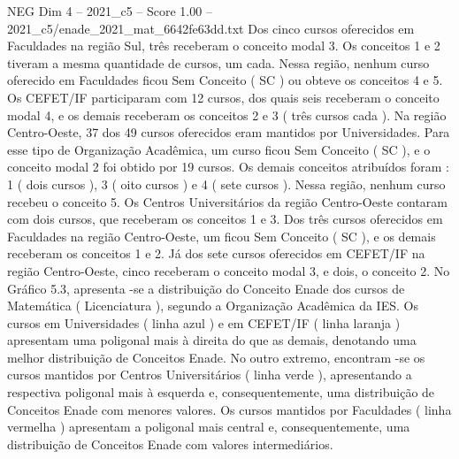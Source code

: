 \begin{textsample}{NEG Dim 4 – 2021\_c5 – Score 1.00 – 2021\_c5/enade\_2021\_mat\_6642fe63dd.txt}
Dos cinco cursos oferecidos em Faculdades na região Sul, três receberam o conceito modal 3.
Os conceitos 1 e 2 tiveram a mesma quantidade de cursos, um cada.
Nessa região, nenhum curso oferecido em Faculdades ficou Sem Conceito ( SC ) ou obteve os conceitos 4 e 5.
Os CEFET/IF participaram com 12 cursos, dos quais seis receberam o conceito modal 4, e os demais receberam os conceitos 2 e 3 ( três cursos cada ).
Na região Centro-Oeste, 37 dos 49 cursos oferecidos eram mantidos por Universidades.
Para esse tipo de Organização Acadêmica, um curso ficou Sem Conceito ( SC ), e o conceito modal 2 foi obtido por 19 cursos.
Os demais conceitos atribuídos foram : 1 ( dois cursos ), 3 ( oito cursos ) e 4 ( sete cursos ).
Nessa região, nenhum curso recebeu o conceito 5.
Os Centros Universitários da região Centro-Oeste contaram com dois cursos, que receberam os conceitos 1 e 3.
Dos três cursos oferecidos em Faculdades na região Centro-Oeste, um ficou Sem Conceito ( SC ), e os demais receberam os conceitos 1 e 2.
Já dos sete cursos oferecidos em CEFET/IF na região Centro-Oeste, cinco receberam o conceito modal 3, e dois, o conceito 2.
No Gráfico 5.3, apresenta -se a distribuição do Conceito Enade dos cursos de Matemática ( Licenciatura ), segundo a Organização Acadêmica da IES.
Os cursos em Universidades ( linha azul ) e em CEFET/IF ( linha laranja ) apresentam uma poligonal mais à direita do que as demais, denotando uma melhor distribuição de Conceitos Enade.
No outro extremo, encontram -se os cursos mantidos por Centros Universitários ( linha verde ), apresentando a respectiva poligonal mais à esquerda e, consequentemente, uma distribuição de Conceitos Enade com menores valores.
Os cursos mantidos por Faculdades ( linha vermelha ) apresentam a poligonal mais central e, consequentemente, uma distribuição de Conceitos Enade com valores intermediários.

\end{textsample}
